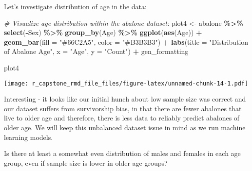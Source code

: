 \documentclass[
]{article}
\newenvironment{Shaded}{\begin{snugshade}}{\end{snugshade}}
\newcommand{\AttributeTok}[1]{\textcolor[rgb]{0.13,0.29,0.53}{#1}}
\newcommand{\CommentTok}[1]{\textcolor[rgb]{0.56,0.35,0.01}{\textit{#1}}}
\newcommand{\FunctionTok}[1]{\textcolor[rgb]{0.13,0.29,0.53}{\textbf{#1}}}
\newcommand{\NormalTok}[1]{#1}
\newcommand{\OtherTok}[1]{\textcolor[rgb]{0.56,0.35,0.01}{#1}}
\newcommand{\SpecialCharTok}[1]{\textcolor[rgb]{0.81,0.36,0.00}{\textbf{#1}}}
\newcommand{\StringTok}[1]{\textcolor[rgb]{0.31,0.60,0.02}{#1}}
\begin{document}
Let's investigate distribution of age in the data:

\begin{Shaded}
\begin{Highlighting}[]
\CommentTok{\# Visualize age distribution within the abalone dataset:}
\NormalTok{plot4 }\OtherTok{\textless{}{-}}\NormalTok{ abalone }\SpecialCharTok{\%\textgreater{}\%} \FunctionTok{select}\NormalTok{(}\SpecialCharTok{{-}}\NormalTok{Sex) }\SpecialCharTok{\%\textgreater{}\%} \FunctionTok{group\_by}\NormalTok{(Age) }\SpecialCharTok{\%\textgreater{}\%}  \FunctionTok{ggplot}\NormalTok{(}\FunctionTok{aes}\NormalTok{(Age)) }\SpecialCharTok{+} 
  \FunctionTok{geom\_bar}\NormalTok{(}\AttributeTok{fill =} \StringTok{"\#66C2A5"}\NormalTok{, }\AttributeTok{color =} \StringTok{"\#B3B3B3"}\NormalTok{) }\SpecialCharTok{+}
  \FunctionTok{labs}\NormalTok{(}\AttributeTok{title =} \StringTok{"Distribution of Abalone Age"}\NormalTok{,}
       \AttributeTok{x =} \StringTok{"Age"}\NormalTok{,}
       \AttributeTok{y =} \StringTok{"Count"}\NormalTok{) }\SpecialCharTok{+}
\NormalTok{  gen\_formatting}

\NormalTok{plot4}
\end{Highlighting}
\end{Shaded}

\texttt{[image: r\_capstone\_rmd\_file\_files/figure-latex/unnamed-chunk-14-1.pdf]}

Interesting - it looks like our initial hunch about low sample size was
correct and our dataset suffers from survivorship bias, in that there
are fewer abalones that live to older age and therefore, there is less
data to reliably predict abalones of older age. We will keep this
unbalanced dataset issue in mind as we run machine learning models.

Is there at least a somewhat even distribution of males and females in
each age group, even if sample size is lower in older age groups?
\end{document}
